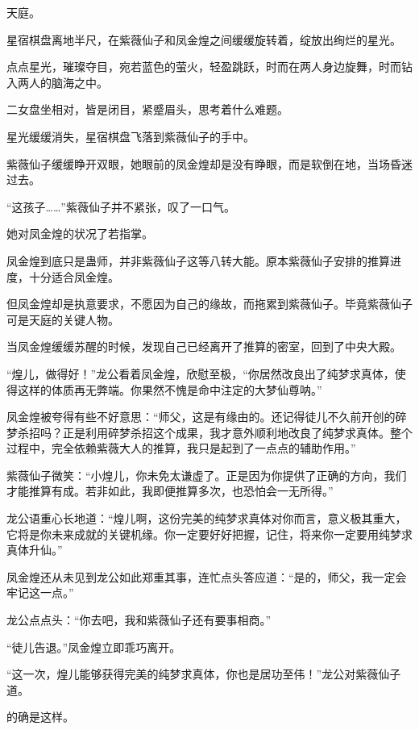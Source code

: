 
\begin{this_body}

天庭。

星宿棋盘离地半尺，在紫薇仙子和凤金煌之间缓缓旋转着，绽放出绚烂的星光。

点点星光，璀璨夺目，宛若蓝色的萤火，轻盈跳跃，时而在两人身边旋舞，时而钻入两人的脑海之中。

二女盘坐相对，皆是闭目，紧蹙眉头，思考着什么难题。

星光缓缓消失，星宿棋盘飞落到紫薇仙子的手中。

紫薇仙子缓缓睁开双眼，她眼前的凤金煌却是没有睁眼，而是软倒在地，当场昏迷过去。

“这孩子……”紫薇仙子并不紧张，叹了一口气。

她对凤金煌的状况了若指掌。

凤金煌到底只是蛊师，并非紫薇仙子这等八转大能。原本紫薇仙子安排的推算进度，十分适合凤金煌。

但凤金煌却是执意要求，不愿因为自己的缘故，而拖累到紫薇仙子。毕竟紫薇仙子可是天庭的关键人物。

当凤金煌缓缓苏醒的时候，发现自己已经离开了推算的密室，回到了中央大殿。

“煌儿，做得好！”龙公看着凤金煌，欣慰至极，“你居然改良出了纯梦求真体，使得这样的体质再无弊端。你果然不愧是命中注定的大梦仙尊呐。”

凤金煌被夸得有些不好意思：“师父，这是有缘由的。还记得徒儿不久前开创的碎梦杀招吗？正是利用碎梦杀招这个成果，我才意外顺利地改良了纯梦求真体。整个过程中，完全依赖紫薇大人的推算，我只是起到了一点点的辅助作用。”

紫薇仙子微笑：“小煌儿，你未免太谦虚了。正是因为你提供了正确的方向，我们才能推算有成。若非如此，我即便推算多次，也恐怕会一无所得。”

龙公语重心长地道：“煌儿啊，这份完美的纯梦求真体对你而言，意义极其重大，它将是你未来成就的关键机缘。你一定要好好把握，记住，将来你一定要用纯梦求真体升仙。”

凤金煌还从未见到龙公如此郑重其事，连忙点头答应道：“是的，师父，我一定会牢记这一点。”

龙公点点头：“你去吧，我和紫薇仙子还有要事相商。”

“徒儿告退。”凤金煌立即乖巧离开。

“这一次，煌儿能够获得完美的纯梦求真体，你也是居功至伟！”龙公对紫薇仙子道。

的确是这样。


\end{this_body}
